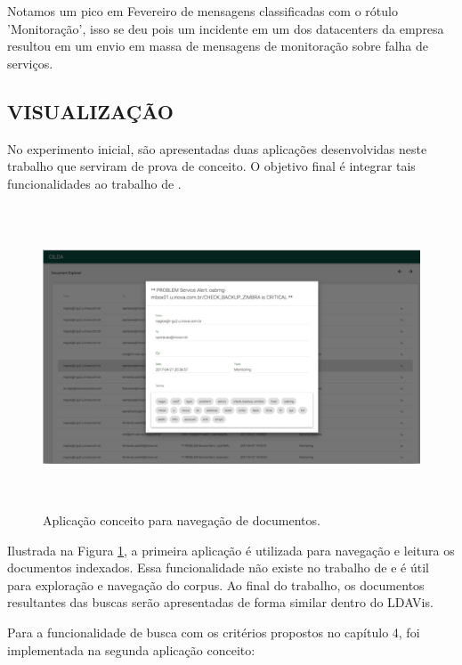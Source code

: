 \documentclass[12pt,a4paper]{article}
\begin{document}
Notamos um pico em Fevereiro de mensagens classificadas
 com o rótulo 'Monitoração', isso se deu pois um incidente em um dos datacenters da empresa resultou em
 um envio em massa de mensagens de monitoração sobre falha de serviços.

\subsection{VISUALIZAÇÃO}

No experimento inicial, são apresentadas duas aplicações desenvolvidas neste trabalho que serviram de prova de conceito.
 O objetivo final é integrar tais funcionalidades ao trabalho de .

\begin{figure}[H]
  \centering
  \includegraphics[height=9cm]{images/figure_8.png}
  \caption{Aplicação conceito para navegação de documentos.}
  \label{fig-doc-explorer}
\end{figure}

Ilustrada na Figura \ref{fig-doc-explorer}, a primeira aplicação é utilizada para navegação e leitura os documentos
 indexados. Essa funcionalidade não existe no trabalho de  e é útil para exploração e navegação do corpus.
 Ao final do trabalho, os documentos resultantes das buscas serão apresentadas de forma similar dentro do LDAVis. 

Para a funcionalidade de busca com os critérios propostos no capítulo 4, foi implementada na segunda aplicação conceito:
\end{document}
